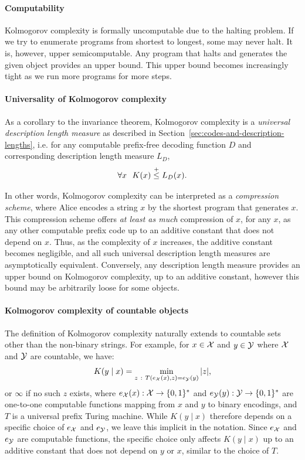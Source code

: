 \paragraph{Computability}
 Kolmogorov complexity is formally uncomputable due to the halting problem. If we try to enumerate programs from shortest to longest, some may never halt. It is, however, upper semicomputable. Any program that halts and generates the given object provides an upper bound. This upper bound becomes increasingly tight as we run more programs for more steps.

\paragraph{Universality of Kolmogorov complexity} As a corollary to the invariance theorem, Kolmogorov complexity is a \emph{universal description length measure} as described in Section~\ref{sec:codes-and-description-lengths}, i.e. for any computable prefix-free decoding function $D$ and corresponding description length measure $L_D$,
\begin{equation}
    \forall x~~K(x) \leqc L_D(x).\label{eq:kolmogrov-universality}
\end{equation}

In other words, Kolmogorov complexity can be interpreted as a \emph{compression scheme}, where Alice encodes a string $x$ by the shortest program that generates $x$. This compression scheme offers \emph{at least as much} compression of $x$, for any $x$, as any other computable prefix code up to an additive constant that does not depend on $x$. Thus, as the complexity of $x$ increases, the additive constant becomes negligible, and all such universal description length measures are asymptotically equivalent.
Conversely, any description length measure provides an upper bound on Kolmogorov complexity, up to an additive constant, however this bound may be arbitrarily loose for some objects.

\paragraph{Kolmogorov complexity of countable objects} 

The definition of Kolmogorov complexity naturally extends to countable sets other than the non-binary strings. For example, for $x \in {\mathcal{X}}$ and $y \in {\mathcal{Y}}$ where ${\mathcal{X}}$ and ${\mathcal{Y}}$ are countable, we have:
\begin{equation}
K(y \mid x) = \min_{z ~:~ T \left( e_{{\mathcal{X}}}(x),z \right) = e_{{\mathcal{Y}}}(y)} |z|,
\end{equation}
or $\infty$ if no such $z$ exists, where $e_{{\mathcal{X}}}(x) : {\mathcal{X}} \rightarrow \{0,1\}^*$ and $e_{{\mathcal{Y}}}(y) : {\mathcal{Y}} \rightarrow \{0,1\}^*$ are one-to-one computable functions mapping from $x$ and $y$ to binary encodings, and $T$ is a universal prefix Turing machine.
While $K(y \mid x)$ therefore depends on a specific choice of $e_{{\mathcal{X}}}$ and $e_{{\mathcal{Y}}}$, we leave this implicit in the notation. Since $e_{{\mathcal{X}}}$ and $e_{{\mathcal{Y}}}$ are computable functions, the specific choice only affects $K(y \mid x)$ up to an additive constant that does not depend on $y$ or $x$, similar to the choice of $T$. 

